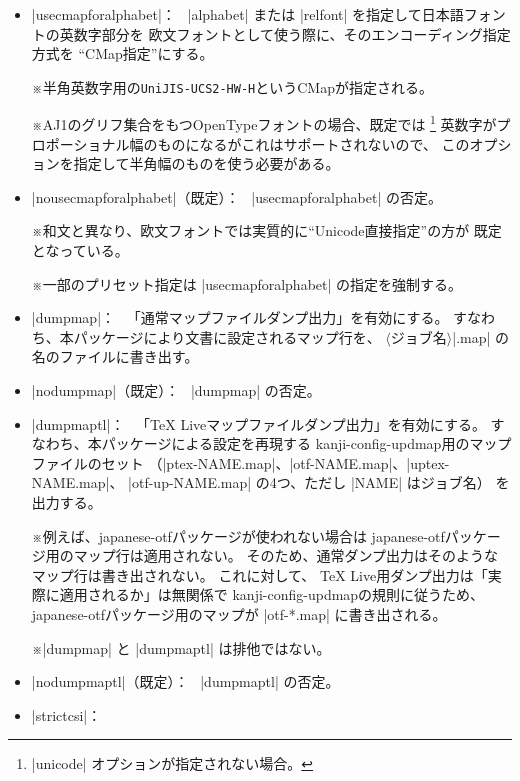 \documentclass[uplatex,dvipdfmx,a4paper]{jsarticle}
\newcommand{\Pkg}[1]{\textsf{#1}}
\newcommand{\Meta}[1]{$\langle$\mbox{}#1\mbox{}$\rangle$}
\newcommand{\Note}{\par\noindent ※}
\newcommand{\Means}{：\ }
\begin{document}
\begin{itemize}
\item |usecmapforalphabet|\Means
  |alphabet| または |relfont| を指定して日本語フォントの英数字部分を
  欧文フォントとして使う際に、そのエンコーディング指定方式を
  “CMap指定”にする。
  \Note 半角英数字用の\texttt{UniJIS-UCS2-HW-H}というCMapが指定される。
  \Note AJ1のグリフ集合をもつOpenTypeフォントの場合、既定では
  \footnote{|unicode| オプションが指定されない場合。}%
  英数字がプロポーショナル幅のものになるがこれはサポートされないので、
  このオプションを指定して半角幅のものを使う必要がある。
\item |nousecmapforalphabet|（既定）\Means
  |usecmapforalphabet| の否定。
  \Note 和文と異なり、欧文フォントでは実質的に“Unicode直接指定”の方が
  既定となっている。
  \Note 一部のプリセット指定は |usecmapforalphabet| の指定を強制する。
\item |dumpmap|\Means
  「通常マップファイルダンプ出力」を有効にする。
  すなわち、本パッケージにより文書に設定されるマップ行を、
  \Meta{ジョブ名}|.map| の名のファイルに書き出す。
\item |nodumpmap|（既定）\Means
  |dumpmap| の否定。
\item |dumpmaptl|\Means
  「{\TeX} Liveマップファイルダンプ出力」を有効にする。
  すなわち、本パッケージによる設定を再現する
  kanji-config-updmap用のマップファイルのセット
  （|ptex-NAME.map|、|otf-NAME.map|、|uptex-NAME.map|、
  |otf-up-NAME.map| の4つ、ただし |NAME| はジョブ名）
  を出力する。
  \Note 例えば、\Pkg{japanese-otf}パッケージが使われない場合は
  \Pkg{japanese-otf}パッケージ用のマップ行は適用されない。
  そのため、通常ダンプ出力はそのようなマップ行は書き出されない。
  これに対して、
  {\TeX} Live用ダンプ出力は「実際に適用されるか」は無関係で
  kanji-config-updmapの規則に従うため、
  \Pkg{japanese-otf}パッケージ用のマップが |otf-*.map| に書き出される。
  \Note |dumpmap| と |dumpmaptl| は排他ではない。
\item |nodumpmaptl|（既定）\Means
  |dumpmaptl| の否定。
\item |strictcsi|\Means

\end{itemize}
\end{document}
